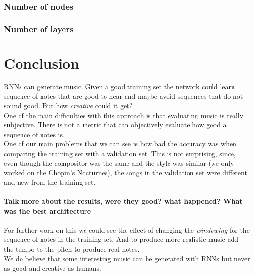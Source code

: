 \documentclass[11pt]
{article}
\begin{document}
\subsubsection{Number of nodes}
\subsubsection{Number of layers}


\section{Conclusion}
RNNs can generate music. 
Given a good training set the network could learn sequence of notes that are good to hear and maybe avoid sequences that do not sound good.
But how \textit{creative} could it get?\\
One of the main difficulties with this approach is that evaluating music is really subjective.
There is not a metric that can objectively evaluate how good a sequence of notes is.\\
One of our main problems that we can see is how bad the accuracy was when comparing the training set with a validation set.
This is not surprising, since,  even though the compositor was the same and the style was similar (we only worked on the Chopin's Nocturnes), the songs in the validation set were different and new from the training set.\\
\\

\textbf{Talk more about the results, were they good? what happened? What was the best architecture}\\
\\

For further work on this we could see the effect of changing the \textit{windowing} for the sequence of notes in the training set.
And to produce more realistic music add the tempo to the pitch to produce real notes.\\
We do believe that some interesting music can be generated with RNNs but never as good and creative as humans.



\end{document}
